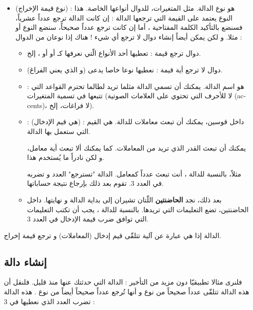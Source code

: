 \begin{itemize}
	\item {}
	 (نوع قيمة الإخراج) : 
	هو نوع الدالة. مثل المتغيرات، للدوال أنواعها الخاصة. هذا النوع يعتمد على القيمة التي ترجعها الدالة : إن كانت الدالة ترجع عدداً عشرياً، فسنضع بالتأكيد الكلمة المفتاحية 
	،
	أما إن كانت ترجع عدداً صحيحاً، سنضع النوع 
	أو 
	مثلا. و لكن يمكن أيضاً إنشاء دوال لا ترجع أي شيء !
	هناك إذا نوعان من الدوال :
	\begin{itemize}
		\item دوال ترجع قيمة : تعطيها أحد الأنواع الّتي نعرفها كـ
		أو 
		أو 
		،
		إلخ.
		\item دوال لا ترجع أية قيمة : نعطيها نوعا خاصا يدعى 
		(و الذي يعني الفراغ).
		\item {} :
		هو اسم الدالة. يمكنك أن تسمي الدالة مثلما تريد لطالما تحترم القواعد التي تتبعها في تسمية المتغيرات (لا للأحرف التي تحتوي على العلامات الصوتية
		(\textenglish{accents})،
		لا فراغات، إلخ).
		\item {} :
		(هي قيم الإدخال) : داخل قوسين، يمكنك أن تبعث معاملات للدالة. هي القيم التي ستعمل بها الدالة.
		\begin{information}
			يمكنك أن تبعث القدر الذي تريد من المعاملات. كما يمكنك ألا تبعث أية معامل، و لكن نادراً ما يُستخدم هذا.
		\end{information}
		
		مثلاً، بالنسبة للدالة 
		،
		أنت تبعث عدداً كمعامل. الدالة "تسترجع" العدد و تضربه في العدد 3. تقوم بعد ذلك بإرجاع نتيجة حساباتها.
		\item بعد ذلك، نجد 
		\textbf{الحاضنتين}
		اللّتان تشيران إلى بداية الدالة و نهايتها. داخل الحاضنتين، تضع التعليمات التي تريدها. بالنسبة للدالة 
		،
		يجب أن تكتب التعليمات التي توافق ضرب قيمة الإدخال في العدد 3.
	\end{itemize}
\end{itemize}
الدالة إذا هي عبارة عن آلية تتلقّى قيم إدخال (المعاملات) و ترجع قيمة إخراج.

\subsection{إنشاء دالة}

فلنرى مثالا تطبيقيّا دون مزيد من التأخير : الدالة 
التي حدثتك عنها منذ قليل. فلنقل أن هذه الدالة تتلقّى عدداً صحيحاً من نوع 
و أنها تُرجع عدداً صحيحاً أيضاً من نوع 
.
هذه الدالة تضرب العدد الذي نعطيها في 3 :

